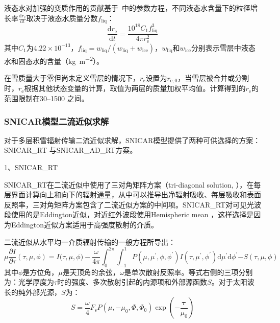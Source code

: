 液态水对加强的变质作用的贡献基于~\citet{brun1989InvestigationWetSnowMetamorphism}中的参数方程，不同液态水含量下的粒径增长率$\frac{{{\mathrm d}r}_{\mathrm e}}{{\mathrm d}t}$取决于液态水质量分数$f_{\mathrm{liq}}$：
%
\begin{equation}
  \frac{{{\mathrm d}r}_{\mathrm e}}{{\mathrm d}t} = \frac{10^{18}C_{1}f_{\mathrm{liq}}^{3}}{4\pi r_{\mathrm e}^{2}}
\end{equation}
%
其中$C_{1}$为$4.22×10^{-13}$，$f_{\mathrm{liq}}=w_{\mathrm{liq}}/(w_{\mathrm{liq}}+w_{\mathrm{ice}})$，$w_{\mathrm{liq}}$和$w_{\mathrm{ice}}$分别表示雪层中液态水和固态水的含量（\unit {kg.m^{-2}}）。

在雪质量大于零但尚未定义雪层的情况下，$r_{\mathrm e}$设置为$r_{\mathrm {e,0}}$，当雪层被合并或分割时，$r_{\mathrm e}$根据其他状态变量的计算，取值为两层的质量加权平均值。计算得到的$r_{\mathrm e}$的范围限制在30--1500 \unit{}之间。

\subsubsection{SNICAR模型二流近似求解}

对于多层积雪辐射传输二流近似求解，SNICAR模型提供了两种可供选择的方案：SNICAR\_RT \citep{dang2019IntercomparisonImprovementTwostream}与SNICAR\_AD\_RT方案\citep{flanner2021SNICARADv3CommunityTool}。

1、SNICAR\_RT

SNICAR\_RT在二流近似中使用了三对角矩阵方案（tri-diagonal
solution, \citet{toon1989RapidCalculationRadiative}），在每层界面计算向上和向下的辐射通量，从中可以推导出净辐射吸收、每层吸收和表面反照率，三对角矩阵方案包含了二流近似方案的中间项。SNICAR\_RT对可见光波段使用的是Eddington近似\citep{wiscombe1980ModelSpectralAlbedo}，对近红外波段使用Hemispheric mean \citep{toon1989RapidCalculationRadiative}，这样选择是因为Eddington近似方案适用于高强度散射的介质。

二流近似从水平均一介质辐射传输的一般方程所导出：
%
\begin{equation}
  \mu\frac{\partial {I}}{\partial\tau}(\tau,\mu,\phi){= I(\tau,}\mu,\phi) - \frac{\omega}{{4}{\pi}}\int_{{0}}^{{2}\pi}{\int_{- 1}^{1}{P\left( \mu,\mu^{'},\phi,\phi^{'} \right)}}I\left( \tau,\mu^{'},\phi^{'} \right){\mathrm d}\mu^{'}{\mathrm d}\phi^{'}{- S}\left( \tau,\mu,\phi \right)
\end{equation}
%
其中\(\phi\)是方位角，\(\mu\)是天顶角的余弦，\(\omega\)是单次散射反照率。等式右侧的三项分别为：光学厚度为\(\tau\)时的强度、多次散射引起的内源项和外部源函数$S$。对于太阳波长的纯外部光源，$S$为：
%
\begin{equation}
  S = \frac{\omega}{4}F_{\mathrm s}P\left( \mu,{- \mu}_{0},\Phi,\Phi_{0} \right)\exp\left( -\frac{\mathbf{\tau}}{\mu_{0}} \right)
\end{equation}

